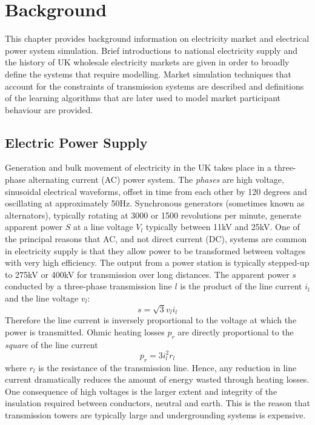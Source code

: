 \chapter{Background}
\label{ch:background}
This chapter provides background information on electricity market and
electrical power system simulation. Brief introductions to national electricity
supply and the history of UK wholesale electricity markets are given in order to
broadly define the systems that require modelling. Market simulation techniques
that account for the constraints of transmission systems are described and
definitions of the learning algorithms that are later used to model
market participant behaviour are provided.

\section{Electric Power Supply}


Generation and bulk movement of electricity in the UK takes place in a
three-phase alternating current (AC) power system.  The \textit{phases} are high
voltage, sinusoidal electrical waveforms, offset in time from each other by 120
degrees and oscillating at approximately 50Hz. Synchronous generators (sometimes
known as alternators), typically rotating at 3000 or 1500 revolutions per
minute, generate apparent power $S$ at a line voltage $V_l$ typically between
11kV and 25kV.  One of the principal reasons that AC, and not direct current
(DC), systems are common in electricity supply is that they allow power to be
transformed between voltages with very high efficiency. The output from a power
station is typically stepped-up to 275kV or 400kV for transmission over long
distances. The apparent power $s$ conducted by a three-phase transmission line
$l$ is the product of the line current $i_l$ and the line voltage $v_l$:
\begin{equation}
s = \sqrt{3} v_l i_l
\end{equation}
Therefore the line current is inversely proportional to the voltage at which
the power is transmitted. Ohmic heating losses $p_{r}$ are directly proportional to the
\textit{square} of the line current
\begin{equation}
p_{r} = 3 i_l^2 r_l
\end{equation}
where $r_l$ is the resistance of the transmission line.  Hence, any reduction in
line current dramatically reduces the amount of energy wasted through heating
losses.  One consequence of high voltages is the larger extent and integrity
of the insulation required between conductors, neutral and earth.  This is the
reason that transmission towers are typically large and undergrounding systems
is expensive.

